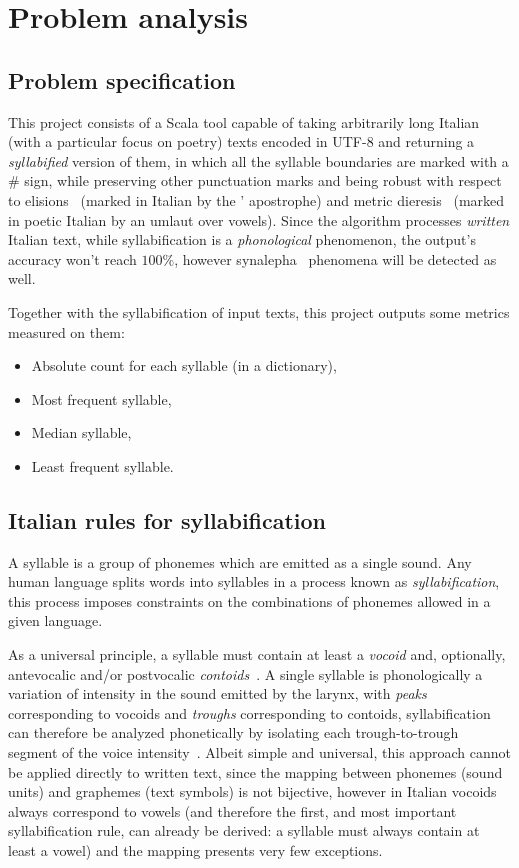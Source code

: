 \chapter{Problem analysis}

\section{Problem specification}
This project consists of a Scala tool capable of taking arbitrarily long Italian (with a particular focus on poetry) texts encoded in UTF-8 and returning a \emph{syllabified} version of them, in which all the syllable boundaries are marked with a $\#$ sign, while preserving other punctuation marks and being robust with respect to elisions~\cite{elision} (marked in Italian by the ' apostrophe) and metric dieresis~\cite{diaeresis} (marked in poetic Italian by an umlaut over vowels).
Since the algorithm processes \emph{written} Italian text, while syllabification is a \emph{phonological} phenomenon, the output's accuracy won't reach $100\%$, however synalepha~\cite{synalepha} phenomena will be detected as well.

Together with the syllabification of input texts, this project outputs some metrics measured on them:
\begin{itemize}
	\item Absolute count for each syllable (in a dictionary),
	\item Most frequent syllable,
	\item Median syllable,
	\item Least frequent syllable.
\end{itemize}

\section{Italian rules for syllabification}
A syllable is a group of phonemes which are emitted as a single sound. Any human language splits words into syllables in a process known as \emph{syllabification}, this process imposes constraints on the combinations of phonemes allowed in a given language.

As a universal principle, a syllable must contain at least a \emph{vocoid} and, optionally, antevocalic and/or postvocalic \emph{contoids}~\cite{demauro}. A single syllable is phonologically a variation of intensity in the sound emitted by the larynx, with \emph{peaks} corresponding to vocoids and \emph{troughs} corresponding to contoids, syllabification can therefore be analyzed phonetically by isolating each trough-to-trough segment of the voice intensity~\cite{maturileoni}.
Albeit simple and universal, this approach cannot be applied directly to written text, since the mapping between phonemes (sound units) and graphemes (text symbols) is not bijective, however in Italian vocoids always correspond to vowels (and therefore the first, and most important syllabification rule, can already be derived: a syllable must always contain at least a vowel) and the mapping presents very few exceptions.

